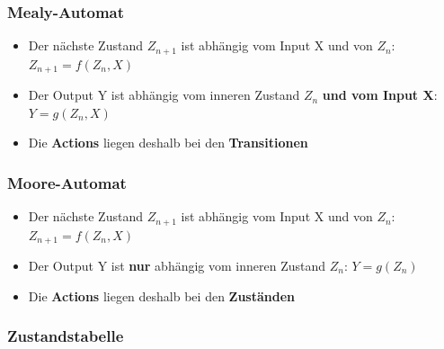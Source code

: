 \subsubsection{Mealy-Automat}
\begin{itemize}
  \item Der nächste Zustand $Z_{n+1}$ ist abhängig vom Input X und von $Z_n$:
        $Z_{n+1}=f(Z_n,X)$
  \item Der Output Y ist abhängig vom inneren Zustand $Z_n$ \textbf{und vom
          Input X}: $Y=g(Z_n, X)$
  \item Die \textbf{Actions} liegen deshalb bei den \textbf{Transitionen}
\end{itemize}

\subsubsection{Moore-Automat}
\begin{itemize}
  \item Der nächste Zustand $Z_{n+1}$ ist abhängig vom Input X und von $Z_n$:
        $Z_{n+1}=f(Z_n,X)$
  \item Der Output Y ist \textbf{nur} abhängig vom inneren Zustand $Z_n$: $Y=g(Z_n)$
  \item Die \textbf{Actions} liegen deshalb bei den \textbf{Zuständen}
\end{itemize}


\subsubsection{Zustandstabelle}

